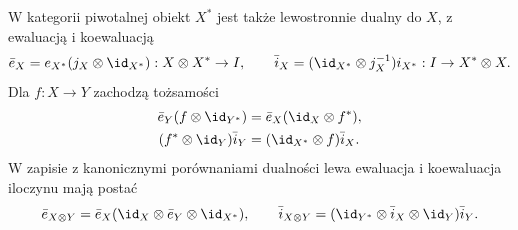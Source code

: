 \begin{stwierdzenie}\label{cat:prop:tf-pivotal-left}
W kategorii piwotalnej obiekt $X^*$ jest także lewostronnie dualny do $X$, z ewaluacją i koewaluacją
\[
 \bar e_X=e_{X^*}(j_X\otimes\id_{X^*}):X\otimes X^*\to I,
 \qquad
 \bar i_X=(\id_{X^*}\otimes j_X^{-1})i_{X^*}:I\to X^*\otimes X.
\]
Dla $f:X\to Y$ zachodzą tożsamości
\begin{align}
 \bar e_Y(f\otimes\id_{Y^*})
 &=\bar e_X(\id_X\otimes f^*),\label{cat:eq:tf-left-eval}\\
 (f^*\otimes\id_Y)\bar i_Y
 &=(\id_{X^*}\otimes f)\bar i_X.\label{cat:eq:tf-left-coeval}
\end{align}
W zapisie z kanonicznymi porównaniami dualności lewa ewaluacja i koewaluacja iloczynu mają postać
\[
 \bar e_{X\otimes Y}=\bar e_X(\id_X\otimes\bar e_Y\otimes\id_{X^*}),
 \qquad
 \bar i_{X\otimes Y}=(\id_{Y^*}\otimes\bar i_X\otimes\id_Y)\bar i_Y.
\]
\end{stwierdzenie}
